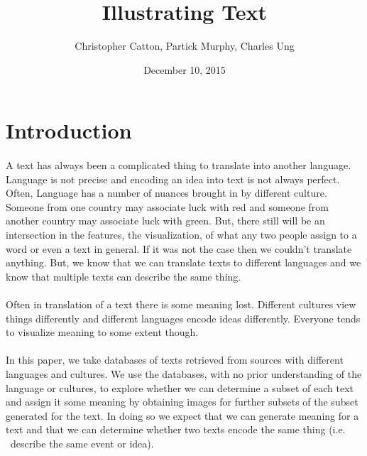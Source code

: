 \documentclass[12pt]{article}
\title{Illustrating Text}
\author{Christopher Catton, Partick Murphy, Charles Ung}
\date{December 10, 2015}
\begin{document}
\maketitle
\section{Introduction}
\paragraph{}
A text has always been a complicated thing to translate into another language. Language
is not precise and encoding an idea into text is not always perfect. Often, Language 
has a number of nuances brought in by different culture. Someone from one country may
associate luck with red and someone from another country may associate luck with green.
But, there still will be an intersection in the features, the visualization, of what
any two people assign to a word or even a text in general. If it was not the case then
we couldn't translate anything. But, we know that we can translate texts to different
languages and we know that multiple texts can describe the same thing.
\paragraph{}
Often in translation of a text there is some meaning lost. Different cultures view things
differently and different languages encode ideas differently. Everyone tends to visualize 
meaning to some extent though.

\paragraph{}
In this paper, we take databases of texts retrieved from sources with different languages and
cultures. We use the databases, with no prior understanding of the language or cultures, to
explore whether we can determine a subset of each text and assign it some meaning by obtaining
images for further subsets of the subset generated for the text. In doing so we expect that
we can generate meaning for a text and that we can determine whether two texts encode the
same thing (i.e. \ describe the same event or idea).

\end{document}
